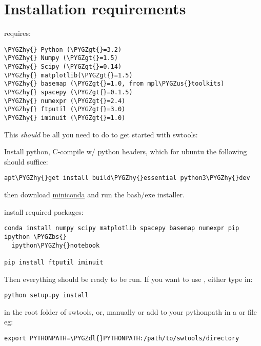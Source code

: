 \documentclass[letterpaper,10pt,english]{sphinxhowto}
\def\PYGZbs{\char`\\}
\def\PYGZus{\char`\_}
\def\PYGZgt{\char`\>}
\def\PYGZdl{\char`\$}
\def\PYGZhy{\char`\-}
\begin{document}
\section{Installation requirements}
\label{install:installation-requirements}\label{install::doc}
 requires:

\begin{Verbatim}[commandchars=\\\{\}]
\PYGZhy{} Python (\PYGZgt{}=3.2)
\PYGZhy{} Numpy (\PYGZgt{}=1.5)
\PYGZhy{} Scipy (\PYGZgt{}=0.14)
\PYGZhy{} matplotlib(\PYGZgt{}=1.5)
\PYGZhy{} basemap (\PYGZgt{}=1.0, from mpl\PYGZus{}toolkits)
\PYGZhy{} spacepy (\PYGZgt{}=0.1.5)
\PYGZhy{} numexpr (\PYGZgt{}=2.4)
\PYGZhy{} ftputil (\PYGZgt{}=3.0)
\PYGZhy{} iminuit (\PYGZgt{}=1.0)
\end{Verbatim}

This \emph{should} be all you need to do to get started with swtools:

Install python, C-compile w/ python headers, which for ubuntu the following should suffice:

\begin{Verbatim}[commandchars=\\\{\}]
apt\PYGZhy{}get install build\PYGZhy{}essential python3\PYGZhy{}dev
\end{Verbatim}

then download \href{http://conda.pydata.org/miniconda.html}{miniconda} and run the bash/exe installer.

install required packages:

\begin{Verbatim}[commandchars=\\\{\}]
conda install numpy scipy matplotlib spacepy basemap numexpr pip ipython \PYGZbs{}
  ipython\PYGZhy{}notebook

pip install ftputil iminuit
\end{Verbatim}

Then everything should be ready to be run. If you want to use , either type in:

\begin{Verbatim}[commandchars=\\\{\}]
python setup.py install
\end{Verbatim}

in the root folder of swtools, or, manually or add  to your pythonpath in a  or  file eg:

\begin{Verbatim}[commandchars=\\\{\}]
export PYTHONPATH=\PYGZdl{}PYTHONPATH:/path/to/swtools/directory
\end{Verbatim}
\end{document}
